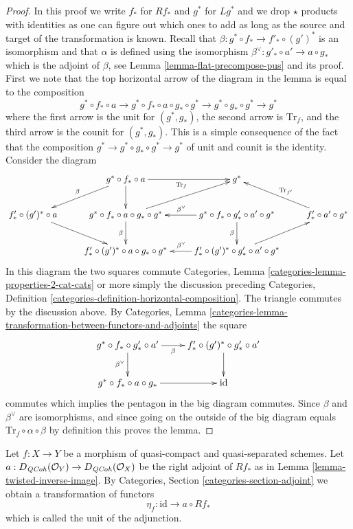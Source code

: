 \begin{proof}
In this proof we write $f_*$ for $Rf_*$ and $g^*$ for $Lg^*$ and we
drop $\star$ products with identities as one can figure out which ones
to add as long as the source and target of the transformation is known.
Recall that $\beta : g^* \circ f_* \to f'_* \circ (g')^*$ is an isomorphism
and that $\alpha$ is defined using
the isomorphism $\beta^\vee : g'_* \circ a' \to a \circ g_*$
which is the adjoint of $\beta$, see Lemma \ref{lemma-flat-precompose-pus}
and its proof. First we note that the top horizontal arrow
of the diagram in the lemma is equal to the composition
$$
g^* \circ f_* \circ a \to
g^* \circ f_* \circ a \circ g_* \circ g^* \to
g^* \circ g_* \circ g^* \to g^*
$$
where the first arrow is the unit for $(g^*, g_*)$, the second arrow
is $\text{Tr}_f$, and the third arrow is the counit for $(g^*, g_*)$.
This is a simple consequence of the fact that the composition
$g^* \to g^* \circ g_* \circ g^* \to g^*$ of unit and counit is the identity.
Consider the diagram
$$
\xymatrix{
& g^* \circ f_* \circ a \ar[ld]_\beta \ar[d] \ar[r]_{\text{Tr}_f} & g^* \\
f'_* \circ (g')^* \circ a \ar[dr] &
g^* \circ f_* \circ a \circ g_* \circ g^* \ar[d]_\beta \ar[ru] &
g^* \circ f_* \circ g'_* \circ a' \circ g^* \ar[l]_{\beta^\vee} \ar[d]_\beta &
f'_* \circ a' \circ g^* \ar[lu]_{\text{Tr}_{f'}} \\
& f'_* \circ (g')^* \circ a \circ g_* \circ g^* &
f'_* \circ (g')^* \circ g'_* \circ a' \circ g^* \ar[ru] \ar[l]_{\beta^\vee}
}
$$
In this diagram the two squares commute 
Categories, Lemma \ref{categories-lemma-properties-2-cat-cats}
or more simply the discussion preceding
Categories, Definition \ref{categories-definition-horizontal-composition}.
The triangle commutes by the discussion above. By
Categories, Lemma
\ref{categories-lemma-transformation-between-functors-and-adjoints}
the square
$$
\xymatrix{
g^* \circ f_* \circ g'_* \circ a' \ar[d]_{\beta^\vee} \ar[r]_-\beta &
f'_* \circ (g')^* \circ g'_* \circ a' \ar[d] \\
g^* \circ f_* \circ a \circ g_* \ar[r] &
\text{id}
}
$$
commutes which implies the pentagon in the big diagram commutes.
Since $\beta$ and $\beta^\vee$ are isomorphisms, and since going on
the outside of the big diagram equals
$\text{Tr}_f \circ \alpha \circ \beta$ by definition this proves the lemma.
\end{proof}

\noindent
Let $f : X \to Y$ be a morphism of quasi-compact and quasi-separated
schemes. Let $a : D_{\mathit{QCoh}}(\mathcal{O}_Y) \to D_{\mathit{QCoh}}(\mathcal{O}_X)$
be the right adjoint of $Rf_*$ as in
Lemma \ref{lemma-twisted-inverse-image}. By
Categories, Section \ref{categories-section-adjoint} we obtain a
transformation of functors
$$
\eta_f : \text{id} \to  a \circ Rf_*
$$
which is called the unit of the adjunction.

